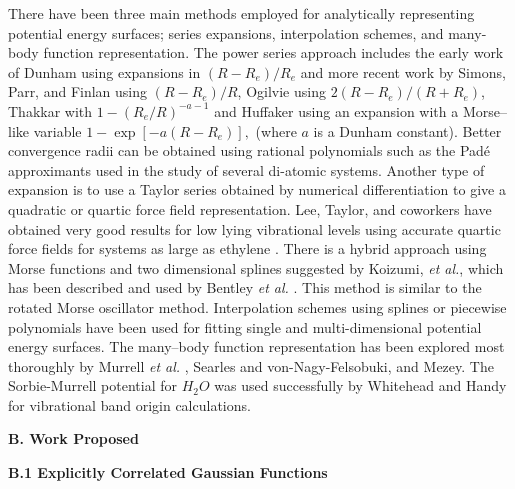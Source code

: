 There have been three main methods employed for analytically representing
potential energy surfaces; series expansions, interpolation schemes, and
many-body function representation. The power series approach includes the
early work of Dunham\cite{Dunham32a,Dunham32b} using expansions in $%
(R-R_e)/R_e$ and more recent work by Simons, Parr, and Finlan\cite{Simons73}
using $(R-R_e)/R$, Ogilvie\cite{Ogilvie81} using $2\left( R-R_e\right)
/\left( R+R_e\right) $, Thakkar\cite{Thakkar75} with $1-(R_e/R)^{-a-1}$ and
Huffaker\cite{Huffaker76} using an expansion with a Morse--like
variable $1-\exp \left[ -a\left( R-R_e\right) \right],$ 
\cite{Morse29} (where $a$ is a Dunham
constant). Better convergence radii can be obtained using rational
polynomials such as the Pad\'{e} approximants used in the study of several
di-atomic systems\cite{Jordan74,Jorish79,Sonnleitner81,Pardo86}. Another
type of expansion is to use a Taylor series obtained by numerical
differentiation to give a quadratic or quartic force field representation.
Lee, Taylor, and coworkers have obtained very
good results for low lying vibrational levels using accurate quartic force
fields\cite{Lee95a,Dateo94,Jorish79,Lee95b,%
ref:t12,ref:t13,ref:t14} for systems as large as ethylene
\cite{Martin95}. There is a hybrid approach using Morse functions and two
dimensional splines suggested by Koizumi, {\it et al.}, \cite{Koizumi91}
which has been described and used by Bentley
{\it et al.}
\cite{Bentley92}. This method is similar to the rotated Morse oscillator
method\cite{Bowman75,Connor75}. Interpolation schemes using splines or
piecewise polynomials have been used for fitting single and
multi-dimensional potential energy surfaces\cite
{Forsythe77,Malik80,Sathyamurthy75,Dunne87,Bruehl88}. The 
many--body function
representation has been explored most thoroughly by Murrell {\it et al.}
\cite{Murrell84},
Searles and von-Nagy-Felsobuki\cite{Searles93}, 
and Mezey. \cite{Mezey87}
The Sorbie-Murrell\cite
{Sorbie75} potential for $H_2O$ was used successfully by Whitehead and Handy%
\cite{Whitehead76} for vibrational band origin calculations. 


\vspace{2mm}
\noindent
{\bf B. Work Proposed}

{\bf B.1 Explicitly Correlated Gaussian Functions}

